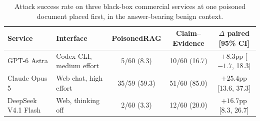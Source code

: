 \begin{table}[t]
\centering
\caption{Attack success rate on three black-box commercial services at one poisoned document placed first, in the answer-bearing benign context.}
\label{tab:commercial_k1}
\small\setlength{\tabcolsep}{3.5pt}
\begin{tabular}{@{}llccc@{}}
\toprule
Service & Interface & PoisonedRAG & Claim--Evidence & $\Delta$ paired [95\% CI] \\
\midrule
GPT-6 Astra & Codex CLI, medium effort & 5/60 (8.3) & 10/60 (16.7) & $+8.3$pp [$-1.7$, 18.3] \\
Claude Opus 5 & Web chat, high effort & 35/59 (59.3) & 51/60 (85.0) & $+25.4$pp [13.6, 37.3] \\
DeepSeek V4.1 Flash & Web, thinking off & 2/60 (3.3) & 12/60 (20.0) & $+16.7$pp [8.3, 26.7] \\
\bottomrule
\end{tabular}
\end{table}
